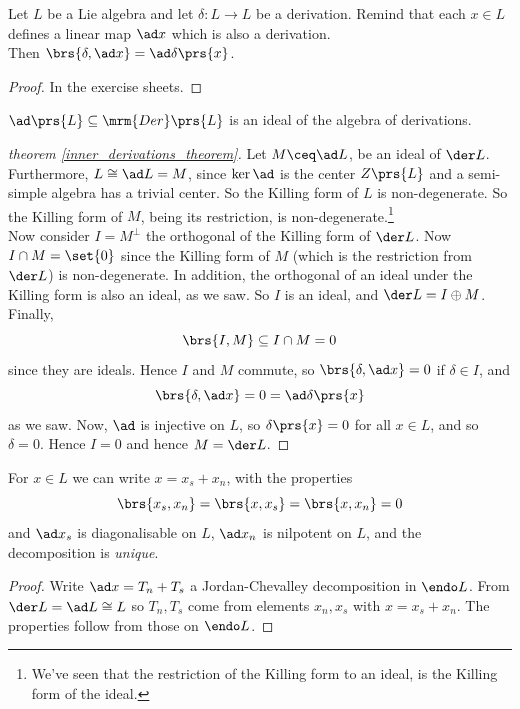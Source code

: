 \documentclass[10pt,a4paper,twoside,openany,hidelinks]{book}
\begin{document}
\begin{lemma}
Let $L$ be a Lie algebra and let $\delta \colon L \to L$ be a derivation. Remind that each $x \in L$ defines a linear map $\ad x$ which is also a derivation.\\
Then $\brs{\delta, \ad x} = \ad \delta\prs{x}$.
\end{lemma}
\begin{proof}
In the exercise sheets.
\end{proof}

\begin{corollary}
$\ad\prs{L} \subseteq \mrm{Der}\prs{L}$ is an ideal of the algebra of derivations.
\end{corollary}

\begin{proof}[theorem \ref{inner_derivations_theorem}]
Let $M \ceq \ad L$, be an ideal of $\der L$. Furthermore, $L \cong \ad L = M$, since $\ker \ad$ is the center $Z\prs{L}$ and a semi-simple algebra has a trivial center. So the Killing form of $L$ is non-degenerate. So the Killing form of $M$, being its restriction, is non-degenerate.\footnote{We've seen that the restriction of the Killing form to an ideal, is the Killing form of the ideal.} \\
Now consider $I = M^{\perp}$ the orthogonal of the Killing form of $\der L$. Now $I \cap M = \set{0}$ since the Killing form of $M$ (which is the restriction from $\der L$) is non-degenerate. In addition, the orthogonal of an ideal under the Killing form is also an ideal, as we saw. So $I$ is an ideal, and $\der L = I \oplus M$. \\
Finally, \[\brs{I,M} \subseteq I \cap M = 0\] since they are ideals. Hence $I$ and $M$ commute, so $\brs{\delta, \ad x} = 0$ if $\delta \in I$, and \[\brs{\delta, \ad x} = 0 = \ad \delta \prs{x}\] as we saw.
Now, $\ad$ is injective on $L$, so $\delta\prs{x} = 0$ for all $x \in L$, and so $\delta = 0$. Hence $I = 0$ and hence $M = \der L$.
\end{proof}

\begin{theorem}
For $x \in L$ we can write $x = x_s + x_n$, with the properties
\[\brs{x_s , x_n} = \brs{x, x_s} = \brs{x, x_n} = 0\] and $\ad x_s$ is diagonalisable on $L$, $\ad x_n$ is nilpotent on $L$, and the decomposition is \emph{unique}.
\end{theorem}
\begin{proof}
Write $\ad x = T_n + T_s$ a Jordan-Chevalley decomposition in $\endo L$. From $\der L = \ad L \cong L$ so $T_n, T_s$ come from elements $x_n, x_s$ with $x = x_s + x_n$. The properties follow from those on $\endo L$.
\end{proof}
\end{document}
